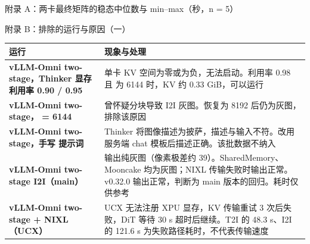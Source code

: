 
\begin{frame}[t]{附录 A：两卡最终矩阵的稳态中位数与 min--max（秒，n = 5）}
\tiny\def\codesize{\relax}
\renewcommand{\arraystretch}{1.1}\setlength{\tabcolsep}{2.5pt}

\vspace{3pt}
\end{frame}

\begin{frame}[t]{附录 B：排除的运行与原因（一）}
\scriptsize\def\codesize{\relax}
\renewcommand{\arraystretch}{1.12}
\setlength{\tabcolsep}{3pt}
\begin{tabularx}{\textwidth}{>{\bfseries}p{3.6cm} Y}
\toprule
{}
运行 & 现象与处理 \\
\midrule
vLLM-Omni two-stage，Thinker 显存利用率 0.90 / 0.95 & 单卡 KV 空间为零或为负，无法启动。利用率 0.98 且  为 6144 时，KV 约 0.33 GiB，可以运行 \\
vLLM-Omni two-stage， = 6144 & 曾怀疑分块导致 I2I 灰图。恢复为 8192 后仍为灰图，排除该原因 \\
vLLM-Omni two-stage，手写  提示词 & Thinker 将图像描述为披萨，描述与输入不符。改用服务端 chat 模板后描述正确。该批数据不纳入 \\
vLLM-Omni two-stage I2I（main） & 输出纯灰图（像素极差约 39）。SharedMemory、Mooncake 均为灰图；NIXL 传输失败时输出正常。v0.32.0 输出正常，判断为 main 版本的回归。耗时仅供参考 \\
vLLM-Omni two-stage + NIXL（UCX） & UCX 无法注册 XPU 显存，KV 传输重试 3 次后失败，DiT 等待 30 s 超时后继续。T2I 的 48.3 s、I2I 的 121.6 s 为失败路径耗时，不代表传输速度 \\
\bottomrule
\end{tabularx}
\end{frame}

